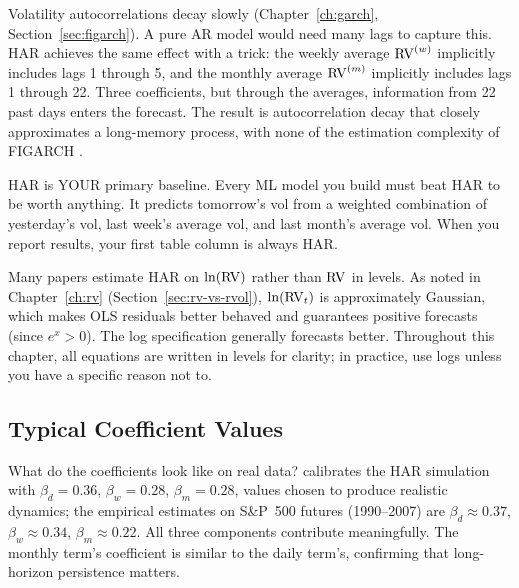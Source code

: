 \begin{intuition}
Volatility autocorrelations decay slowly (Chapter~\ref{ch:garch}, Section~\ref{sec:figarch}).
A pure AR model would need many lags to capture this.
HAR achieves the same effect with a trick: the weekly average $\operatorname{RV}^{(w)}$ implicitly includes lags 1 through 5, and the monthly average $\operatorname{RV}^{(m)}$ implicitly includes lags 1 through 22.
Three coefficients, but through the averages, information from 22 past days enters the forecast.
The result is autocorrelation decay that closely approximates a long-memory process, with none of the estimation complexity of FIGARCH \citep{Corsi2009}.
\end{intuition}

\begin{projectconnection}
HAR is YOUR primary baseline.
Every ML model you build must beat HAR to be worth anything.
It predicts tomorrow's vol from a weighted combination of yesterday's vol, last week's average vol, and last month's average vol.
When you report results, your first table column is always HAR.
\end{projectconnection}

\begin{warning}
Many papers estimate HAR on $\ln(\operatorname{RV})$ rather than $\operatorname{RV}$ in levels.
As noted in Chapter~\ref{ch:rv} (Section~\ref{sec:rv-vs-rvol}), $\ln(\operatorname{RV}_t)$ is approximately Gaussian, which makes OLS residuals better behaved and guarantees positive forecasts (since $e^x > 0$).
The log specification generally forecasts better.
Throughout this chapter, all equations are written in levels for clarity; in practice, use logs unless you have a specific reason not to.
\end{warning}

\subsection{Typical Coefficient Values}

What do the coefficients look like on real data?
\citet{Corsi2009} calibrates the HAR simulation with $\beta_d = 0.36$, $\beta_w = 0.28$, $\beta_m = 0.28$, values chosen to produce realistic dynamics; the empirical estimates on S\&P~500 futures (1990--2007) are $\beta_d \approx 0.37$, $\beta_w \approx 0.34$, $\beta_m \approx 0.22$.
All three components contribute meaningfully.
The monthly term's coefficient is similar to the daily term's, confirming that long-horizon persistence matters.

